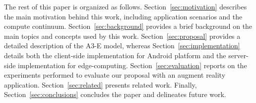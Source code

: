 The rest of this paper is organized as follows. Section~\ref{sec:motivation} describes the main motivation behind this work, including application scenarios and the compute continuum. Section~\ref{sec:background} provides a brief background on the main topics and concepts used by this work. Section~\ref{sec:proposal} provides a detailed description of the A3-E model, whereas Section~\ref{sec:implementation} details both the client-side implementation for Android platform and the server-side implementation for edge-computing. Section~\ref{sec:evaluation} reports on the experiments performed to evaluate our proposal with an augment reality application. Section~\ref{sec:related} presents related work. Finally, Section~\ref{sec:conclusions} concludes the paper and delineates future work.




